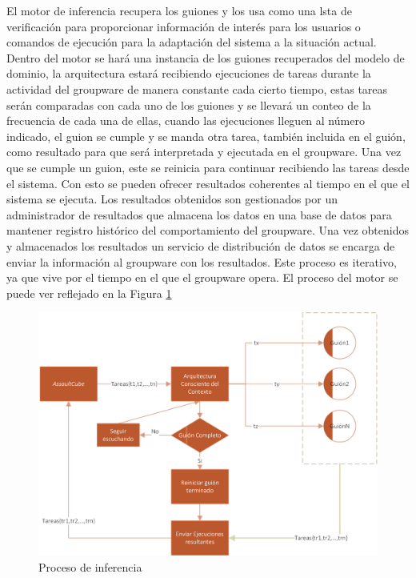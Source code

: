 El motor de inferencia recupera los guiones y los usa como una lsta de verificaci\'on para proporcionar informaci\'on de inter\'es para los usuarios o comandos de ejecuci\'on para la adaptaci\'on del sistema a la situaci\'on actual. Dentro del motor se har\'a una instancia de los guiones recuperados del modelo de dominio, la arquitectura estar\'a recibiendo ejecuciones de tareas durante la actividad del groupware de manera constante cada cierto tiempo, estas tareas ser\'an comparadas con cada uno de los guiones y se llevar\'a un conteo de la frecuencia de cada una de ellas, cuando las ejecuciones lleguen al n\'umero indicado, el guion se cumple y se manda otra tarea, tambi\'en incluida en el gui\'on, como resultado para que ser\'a interpretada y ejecutada en el groupware. Una vez que se cumple un guion, este se reinicia para continuar recibiendo las tareas desde el sistema. Con esto se pueden ofrecer resultados coherentes al tiempo en el que el sistema se ejecuta. Los resultados obtenidos son gestionados por un administrador de resultados que almacena los datos en una base de datos para mantener registro hist\'orico del comportamiento del groupware. Una vez obtenidos y almacenados los resultados un servicio de distribuci\'on de datos se encarga de enviar la informaci\'on al groupware con los resultados. Este proceso es iterativo, ya que vive por el tiempo en el que el groupware opera.  El proceso del motor se puede ver reflejado en la Figura \ref{arch:useofcontext}

\begin{figure}[h!]
\centering
\includegraphics[scale=0.80]{images/RunningProcess_ESP}
\caption{Proceso de inferencia}
\label{arch:useofcontext}
\end{figure}